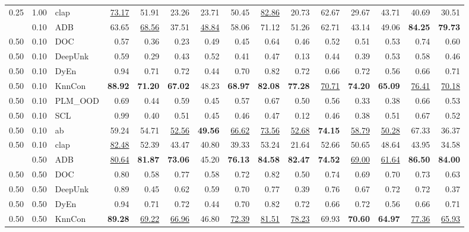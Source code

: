 \begin{table}[t]
{\begin{tabular}{lllrrrrrrrrrrrr}
0.25 & 1.00 & clap & \underline{73.17} & 51.91 & 23.26 & 23.71 & 50.45 & \underline{82.86} & 20.73 & 62.67 & 29.67 & 43.71 & 40.69 & 30.51 \\
\addlinespace
0.50 & 0.10 & ADB & 63.65 & \underline{68.56} & 37.51 & \underline{48.84} & 58.06 & 71.12 & 51.26 & 62.71 & 43.14 & 49.06 & \textbf{84.25} & \textbf{79.73} \\
0.50 & 0.10 & DOC & 0.57 & 0.36 & 0.23 & 0.49 & 0.45 & 0.64 & 0.46 & 0.52 & 0.51 & 0.53 & 0.74 & 0.60 \\
0.50 & 0.10 & DeepUnk & 0.59 & 0.29 & 0.43 & 0.52 & 0.41 & 0.47 & 0.13 & 0.44 & 0.39 & 0.53 & 0.58 & 0.46 \\
0.50 & 0.10 & DyEn & 0.94 & 0.71 & 0.72 & 0.44 & 0.70 & 0.82 & 0.72 & 0.66 & 0.72 & 0.56 & 0.66 & 0.71 \\
0.50 & 0.10 & KnnCon & \textbf{88.92} & \textbf{71.20} & \textbf{67.02} & 48.23 & \textbf{68.97} & \textbf{82.08} & \textbf{77.28} & \underline{70.71} & \textbf{74.20} & \textbf{65.09} & \underline{76.41} & \underline{70.18} \\
0.50 & 0.10 & PLM_OOD & 0.69 & 0.44 & 0.59 & 0.45 & 0.57 & 0.67 & 0.50 & 0.56 & 0.33 & 0.38 & 0.66 & 0.53 \\
0.50 & 0.10 & SCL & 0.99 & 0.40 & 0.51 & 0.45 & 0.46 & 0.47 & 0.12 & 0.46 & 0.38 & 0.51 & 0.67 & 0.52 \\
0.50 & 0.10 & ab & 59.24 & 54.71 & \underline{52.56} & \textbf{49.56} & \underline{66.62} & \underline{73.56} & \underline{52.68} & \textbf{74.15} & \underline{58.79} & \underline{50.28} & 67.33 & 36.37 \\
0.50 & 0.10 & clap & \underline{82.48} & 52.39 & 43.47 & 40.80 & 39.33 & 53.24 & 21.64 & 52.66 & 50.65 & 48.64 & 43.95 & 34.58 \\
\addlinespace
0.50 & 0.50 & ADB & \underline{80.64} & \textbf{81.87} & \textbf{73.06} & 45.20 & \textbf{76.13} & \textbf{84.58} & \textbf{82.47} & \textbf{74.52} & \underline{69.00} & \underline{61.64} & \textbf{86.50} & \textbf{84.00} \\
0.50 & 0.50 & DOC & 0.80 & 0.58 & 0.77 & 0.58 & 0.72 & 0.82 & 0.50 & 0.74 & 0.69 & 0.70 & 0.73 & 0.63 \\
0.50 & 0.50 & DeepUnk & 0.89 & 0.45 & 0.62 & 0.59 & 0.70 & 0.77 & 0.39 & 0.76 & 0.67 & 0.72 & 0.72 & 0.37 \\
0.50 & 0.50 & DyEn & 0.94 & 0.71 & 0.72 & 0.44 & 0.70 & 0.82 & 0.72 & 0.66 & 0.72 & 0.56 & 0.66 & 0.71 \\
0.50 & 0.50 & KnnCon & \textbf{89.28} & \underline{69.22} & \underline{66.96} & 46.80 & \underline{72.39} & \underline{81.51} & \underline{78.23} & 69.93 & \textbf{70.60} & \textbf{64.97} & \underline{77.36} & \underline{65.93} \\

\end{tabular}}
\end{table}

